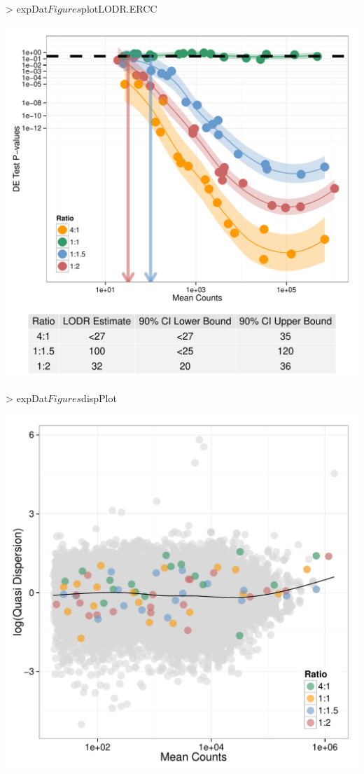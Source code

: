 \documentclass{article}
\begin{document}
\begin{center}
\begin{Schunk}
\begin{Sinput}
> expDat$Figures$plotLODR.ERCC
\end{Sinput}
\end{Schunk}
\includegraphics{erccdashboardVignette-printPanelBSEQC}
\end{center}
\clearpage
\begin{center}
\begin{Schunk}
\begin{Sinput}
> expDat$Figures$dispPlot
\end{Sinput}
\end{Schunk}
\includegraphics{erccdashboardVignette-printPanelCSEQC}
\end{center}
\end{document}

